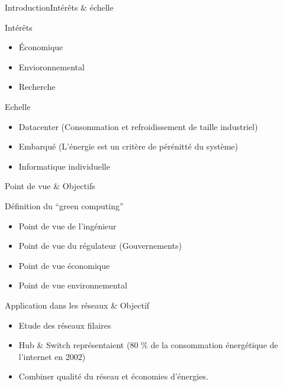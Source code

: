 


\maketitle

\begin{frame}{Introduction}{Intérêts \& échelle}

\begin{block}{Intérêts}

\begin{itemize}
\item Économique
\item Envioronnemental
\item Recherche
\end{itemize}

\end{block}


\begin{block}{Echelle}
\begin{itemize}
\item Datacenter (Consommation et refroidissement de taille industriel)
\item Embarqué (L'énergie est un critère de pérénitté du système)
\item Informatique individuelle
\end{itemize}
\end{block}

\end{frame}

\begin{frame}{Point de vue \& Objectifs}{}

\begin{block}{Définition du ``green computing''}
\begin{itemize}
\item Point de vue de l'ingénieur
\item Point de vue du régulateur (Gouvernements)
\item Point de vue économique
\item Point de vue environnemental
\end{itemize}
\end{block}


\begin{block}{Application dans les réseaux \& Objectif}
\begin{itemize}
\item Etude des réseaux filaires
\item Hub \& Switch représentaient (80 \% de la consommation énergétique de l'internet en 2002)
\item Combiner qualité du réseau et économies d'énergies.
\end{itemize}
\end{block}

\end{frame}

